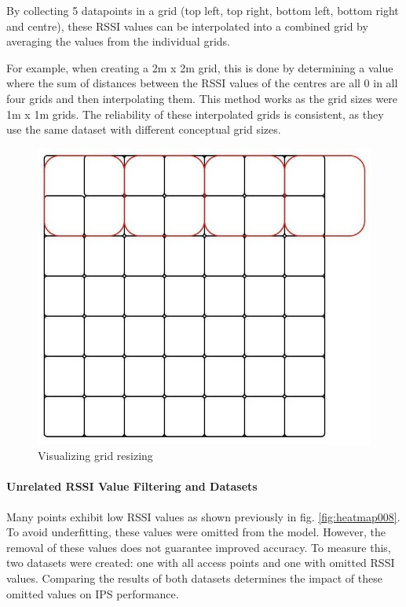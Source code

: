 \documentclass[runningheads]{llncs}
\begin{document}
By collecting 5 datapoints in a grid (top left, top right, bottom left, bottom right and centre), these RSSI values can be interpolated into a combined grid by averaging the values from the individual grids.

For example, when creating a 2m x 2m grid, this is done by determining a value where the sum of distances between the RSSI values of the centres are all 0 in all four grids and then interpolating them. This method works as the grid sizes were 1m x 1m grids. The reliability of these interpolated grids is consistent, as they use the same dataset with different conceptual grid sizes.

\begin{figure}[htbp]
	\centerline{\includegraphics[scale=0.5]{image14.jpg}}
	\caption{Visualizing grid resizing}
	\label{fig:vis_grid_resize}
\end{figure}

\paragraph{Unrelated RSSI Value Filtering and Datasets} Many points exhibit low RSSI values as shown previously in fig. \ref{fig:heatmap008}. To avoid underfitting, these values were omitted from the model. However, the removal of these values does not guarantee improved accuracy. To measure this, two datasets were created: one with all access points and one with omitted RSSI values. Comparing the results of both datasets determines the impact of these omitted values on IPS performance.
\end{document}
